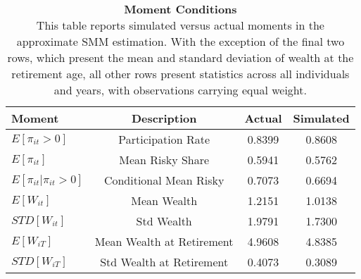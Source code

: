 \documentclass[13pt]{article}
\begin{document}
\begin{table}[!htbp]
    \centering
    \caption{\textbf{Moment Conditions} \\ 
    \small{
    This table reports simulated versus actual moments in the approximate SMM estimation. With the exception of the final two rows, which present the mean and standard deviation of wealth at the retirement age, all other rows present statistics across all individuals and years, with observations carrying equal weight.
    }
    }
    \begin{tabular}{lccc}
        \hline
        \textbf{Moment} & \textbf{Description} & \textbf{Actual} & \textbf{Simulated} \\
        \hline
        \(E[\pi_{it} > 0]\) & Participation Rate & 0.8399 & 0.8608 \\
        \(E[\pi_{it}]\) & Mean Risky Share & 0.5941 & 0.5762 \\
        \(E[\pi_{it}|\pi_{it} > 0]\) & Conditional Mean Risky & 0.7073 & 0.6694 \\
        \(E[W_{it}]\) & Mean Wealth & 1.2151 & 1.0138 \\
        \(STD[W_{it}]\) & Std Wealth & 1.9791 & 1.7300 \\
        \(E[W_{iT}]\) & Mean Wealth at Retirement & 4.9608 & 4.8385 \\
        \(STD[W_{iT}]\) & Std Wealth at Retirement & 0.4073 & 0.3089 \\
        \hline
    \end{tabular}
    \label{tab:moments}
\end{table}
\end{document}
